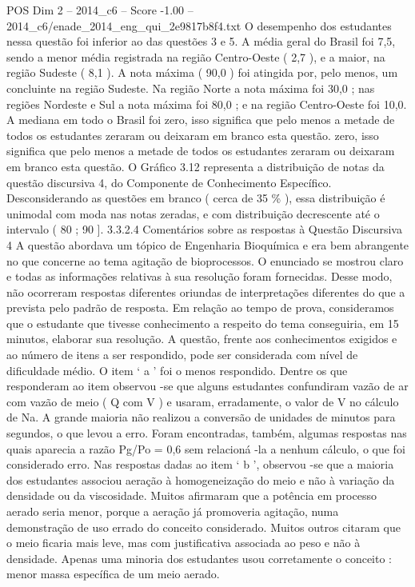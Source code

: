 \begin{textsample}{POS Dim 2 – 2014\_c6 – Score -1.00 – 2014\_c6/enade\_2014\_eng\_qui\_2e9817b8f4.txt}
O desempenho dos estudantes nessa questão foi inferior ao das questões 3 e 5.
A média geral do Brasil foi 7,5, sendo a menor média registrada na região Centro-Oeste ( 2,7 ), e a maior, na região Sudeste ( 8,1 ).
A nota máxima ( 90,0 ) foi atingida por, pelo menos, um concluinte na região Sudeste.
Na região Norte a nota máxima foi 30,0 ; nas regiões Nordeste e Sul a nota máxima foi 80,0 ; e na região Centro-Oeste foi 10,0.
A mediana em todo o Brasil foi zero, isso significa que pelo menos a metade de todos os estudantes zeraram ou deixaram em branco esta questão. zero, isso significa que pelo menos a metade de todos os estudantes zeraram ou deixaram em branco esta questão.
O Gráfico 3.12 representa a distribuição de notas da questão discursiva 4, do Componente de Conhecimento Específico.
Desconsiderando as questões em branco ( cerca de 35 \% ), essa distribuição é unimodal com moda nas notas zeradas, e com distribuição decrescente até o intervalo ( 80 ; 90 ]. 3.3.2.4 Comentários sobre as respostas à Questão Discursiva 4 A questão abordava um tópico de Engenharia Bioquímica e era bem abrangente no que concerne ao tema agitação de bioprocessos.
O enunciado se mostrou claro e todas as informações relativas à sua resolução foram fornecidas.
Desse modo, não ocorreram respostas diferentes oriundas de interpretações diferentes do que a prevista pelo padrão de resposta.
Em relação ao tempo de prova, consideramos que o estudante que tivesse conhecimento a respeito do tema conseguiria, em 15 minutos, elaborar sua resolução.
A questão, frente aos conhecimentos exigidos e ao número de itens a ser respondido, pode ser considerada com nível de dificuldade médio.
O item ‘ a ’ foi o menos respondido.
Dentre os que responderam ao item observou -se que alguns estudantes confundiram vazão de ar com vazão de meio ( Q com V ) e usaram, erradamente, o valor de V no cálculo de Na.
A grande maioria não realizou a conversão de unidades de minutos para segundos, o que levou a erro.
Foram encontradas, também, algumas respostas nas quais aparecia a razão Pg/Po = 0,6 sem relacioná -la a nenhum cálculo, o que foi considerado erro.
Nas respostas dadas ao item ‘ b ’, observou -se que a maioria dos estudantes associou aeração à homogeneização do meio e não à variação da densidade ou da viscosidade.
Muitos afirmaram que a potência em processo aerado seria menor, porque a aeração já promoveria agitação, numa demonstração de uso errado do conceito considerado.
Muitos outros citaram que o meio ficaria mais leve, mas com justificativa associada ao peso e não à densidade.
Apenas uma minoria dos estudantes usou corretamente o conceito : menor massa específica de um meio aerado.

\end{textsample}
